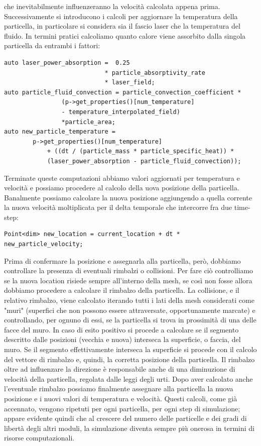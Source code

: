         che inevitabilmente influenzeranno la velocità calcolata appena prima. Successivamente si introducono i calcoli per aggiornare la temperatura della particella,
        in particolare si considera sia il fascio laser che la temperatura del fluido. In termini pratici calcoliamo quanto calore viene assorbito dalla singola particella
        da entrambi i fattori:
        \begin{verbatim}
auto laser_power_absorption =  0.25 
                            * particle_absorptivity_rate 
                            * laser_field;
auto particle_fluid_convection = particle_convection_coefficient *
                (p->get_properties()[num_temperature]
                - temperature_interpolated_field)
                *particle_area;
auto new_particle_temperature =
        p->get_properties()[num_temperature]
            + ((dt / (particle_mass * particle_specific_heat)) *
            (laser_power_absorption - particle_fluid_convection));
        \end{verbatim}
        Terminate queste computazioni abbiamo valori aggiornati per temperatura e velocità e possiamo procedere al calcolo della uova posizione della particella.
        Banalmente possiamo calcolare la nuova posizione aggiungendo a quella corrente la nuova velocità moltiplicata per il delta temporale che intercorre fra due time-step:

        \begin{verbatim}
Point<dim> new_location = current_location + dt * new_particle_velocity;
        \end{verbatim}
        Prima di confermare la posizione e assegnarla alla particella, però, dobbiamo controllare la presenza di eventuali rimbalzi o collisioni.
        Per fare ciò controlliamo se la nuova location risiede sempre all'interno della mesh, se così non fosse allora dobbiamo procedere a calcolare il rimbalzo della particella.
        La collisione, e il relativo rimbalzo, viene calcolato iterando tutti i lati della mesh considerati come "muri" (superfici che non possono essere attraversate, opportunamente marcate)
        e controllando, per ognuno di essi, se la particella si trova in prossimità di una delle facce del muro. In caso di esito positivo si procede a calcolare se il segmento descritto dalle posizioni
        (vecchia e nuova) interseca la superficie, o faccia, del muro. Se il segmento effettivamente interseca la superficie si procede con il calcolo del vettore di rimbalzo e, quindi, la corretta posizione
        della particella.
        Il rimbalzo oltre ad influenzare la direzione è responsabile anche di una diminuzione di velocità della particella, regolata dalle leggi degli urti.
        Dopo aver calcolato anche l'eventuale rimbalzo possiamo finalmente assegnare alla particella la nuova posizione e i nuovi valori di temperatura e velocità.
        Questi calcoli, come già accennato, vengono ripetuti per ogni particella, per ogni step di simulazione; appare evidente quindi che al crescere del numero delle particelle e dei gradi di libertà degli altri moduli,
        la simulazione diventa sempre più onerosa in termini di risorse computazionali.

